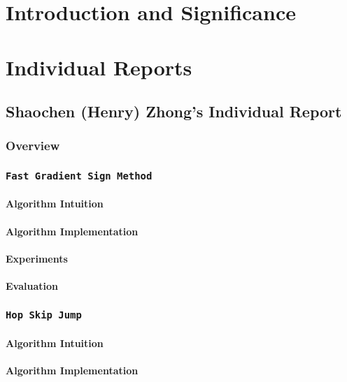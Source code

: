 \documentclass[11pt]{article}
\newcommand{\ilc}{\texttt}
\begin{document}
\setcounter{tocdepth}{4}
\vspace{0.5cm}
{\hypersetup{hidelinks}
\tableofcontents
}

\newpage

\section{Introduction and Significance}

\section{Individual Reports}

\subsection{Shaochen (Henry) Zhong's Individual Report}
\subsubsection{Overview}


\subsubsection{\ilc{Fast Gradient Sign Method}}
\paragraph{Algorithm Intuition}
\paragraph{Algorithm Implementation}
\paragraph{Experiments}
\paragraph{Evaluation}

\subsubsection{\ilc{Hop Skip Jump}}
\paragraph{Algorithm Intuition}
\paragraph{Algorithm Implementation}
\end{document}
